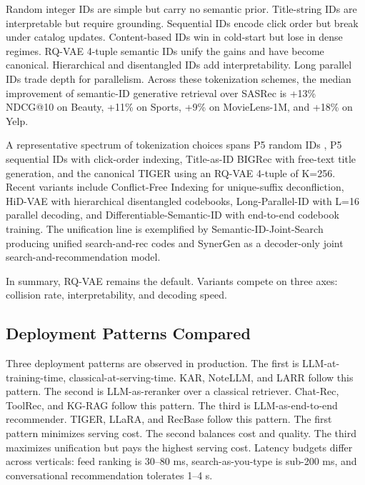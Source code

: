 \documentclass{article}
\begin{document}
Random integer IDs are simple but carry no semantic prior. Title-string IDs are interpretable but require grounding. Sequential IDs encode click order but break under catalog updates. Content-based IDs win in cold-start but lose in dense regimes. RQ-VAE 4-tuple semantic IDs unify the gains and have become canonical. Hierarchical and disentangled IDs add interpretability. Long parallel IDs trade depth for parallelism. Across these tokenization schemes, the median improvement of semantic-ID generative retrieval over SASRec is +13\% NDCG@10 on Beauty, +11\% on Sports, +9\% on MovieLens-1M, and +18\% on Yelp.

A representative spectrum of tokenization choices spans P5 random IDs \citep{geng2022recsys2022}, P5 sequential IDs \citep{hua2023sigirapcikm2023} with click-order indexing, Title-as-ID BIGRec \citep{bao2023arxiv2305004472023} with free-text title generation, and the canonical TIGER \citep{rajput2023recommendersystems} using an RQ-VAE 4-tuple of K=256. Recent variants include Conflict-Free Indexing \citep{zhang2025purelysemanticinde} for unique-suffix deconfliction, HiD-VAE \citep{fang2025hidvaeinterpretabl} with hierarchical disentangled codebooks, Long-Parallel-ID \citep{hou2025generatinglongsema} with L=16 parallel decoding, and Differentiable-Semantic-ID \citep{fu2026differentiablesema} with end-to-end codebook training. The unification line is exemplified by Semantic-ID-Joint-Search \citep{penha2025semanticidsforjoin} producing unified search-and-rec codes and SynerGen \citep{gao2025synergencontextual} as a decoder-only joint search-and-recommendation model.

In summary, RQ-VAE remains the default. Variants compete on three axes: collision rate, interpretability, and decoding speed.

\subsection{Deployment Patterns Compared}\label{deployment-patterns-compared}

Three deployment patterns are observed in production. The first is LLM-at-training-time, classical-at-serving-time. KAR, NoteLLM, and LARR follow this pattern. The second is LLM-as-reranker over a classical retriever. Chat-Rec, ToolRec, and KG-RAG follow this pattern. The third is LLM-as-end-to-end recommender. TIGER, LLaRA, and RecBase follow this pattern. The first pattern minimizes serving cost. The second balances cost and quality. The third maximizes unification but pays the highest serving cost. Latency budgets differ across verticals: feed ranking is 30--80 ms, search-as-you-type is sub-200 ms, and conversational recommendation tolerates 1--4 s.
\end{document}
